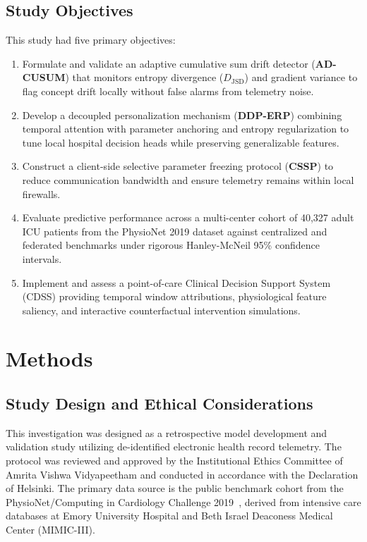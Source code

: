 \documentclass[11pt,a4paper]{article}
\begin{document}
\subsection{Study Objectives}
This study had five primary objectives:
\begin{enumerate}
    \item Formulate and validate an adaptive cumulative sum drift detector (\textbf{AD-CUSUM}) that monitors entropy divergence ($D_{\text{JSD}}$) and gradient variance to flag concept drift locally without false alarms from telemetry noise.
    \item Develop a decoupled personalization mechanism (\textbf{DDP-ERP}) combining temporal attention with parameter anchoring and entropy regularization to tune local hospital decision heads while preserving generalizable features.
    \item Construct a client-side selective parameter freezing protocol (\textbf{CSSP}) to reduce communication bandwidth and ensure telemetry remains within local firewalls.
    \item Evaluate predictive performance across a multi-center cohort of 40,327 adult ICU patients from the PhysioNet 2019 dataset against centralized and federated benchmarks under rigorous Hanley-McNeil 95\% confidence intervals.
    \item Implement and assess a point-of-care Clinical Decision Support System (CDSS) providing temporal window attributions, physiological feature saliency, and interactive counterfactual intervention simulations.
\end{enumerate}

\section{Methods}

\subsection{Study Design and Ethical Considerations}
This investigation was designed as a retrospective model development and validation study utilizing de-identified electronic health record telemetry. The protocol was reviewed and approved by the Institutional Ethics Committee of Amrita Vishwa Vidyapeetham and conducted in accordance with the Declaration of Helsinki. The primary data source is the public benchmark cohort from the PhysioNet/Computing in Cardiology Challenge 2019~\cite{reyna2020physionet}, derived from intensive care databases at Emory University Hospital and Beth Israel Deaconess Medical Center (MIMIC-III).
\end{document}
